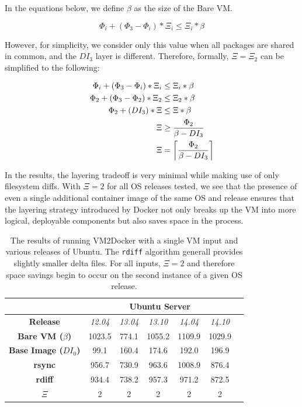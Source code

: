 In the equations below, we define $\beta$ as the size of the Bare VM.

\begin{equation}
\Phi_i + (\Phi_3 - \Phi_i)* \Xi_i \le \Xi_i * \beta
\end{equation}

However, for simplicity, we consider only this value when all packages are shared in common, and the $DI_3$ layer is different. Therefore, formally, $\Xi = \Xi_2$ can be simplified to the following:

\begin{align*}
\Phi_i + (\Phi_3 - \Phi_i)* \Xi_i &\le \Xi_i * \beta \\
\Phi_2 + (\Phi_3 - \Phi_2)* \Xi_2 &\le \Xi_2 * \beta \\
\Phi_2 + (DI_3)* \Xi &\le \Xi * \beta\\
\Xi &\ge \frac{\Phi_2}{\beta - DI_3} \\
\Xi &= \ceil*{\frac{\Phi_2}{\beta - DI_3}}
\end{align*}


In the results, the layering tradeoff is very minimal while making use of only filesystem diffs. With $\Xi =2$ for all OS releases tested, we see that the presence of even a single additional container image of the same OS and release ensures that the layering strategy introduced by Docker not only breaks up the VM into more logical, deployable components but also saves space in the process.

\begin{table}[h]
\centering
    \begin{tabular}{| c | c | c | c | c | c | c |}
    \hline
& \multicolumn{5}{|c|}{\bfseries Ubuntu Server} \\ \hline
    \bfseries Release & \itshape 12.04 & \itshape 13.04 & \itshape 13.10 & \itshape 14.04 & \itshape 14.10 \\ \hline
    \bfseries Bare VM ($\beta$) & 1023.5 & 774.1 & 1055.2 & 1109.9 & 1029.9\\ \hline
    \bfseries Base Image ($DI_0$) & 99.1 & 160.4 & 174.6 & 192.0 & 196.9  \\ \hline
    \bfseries rsync & 956.7 & 730.9 & 963.6 & 1008.9 & 876.4\\ \hline 
    \bfseries rdiff & 934.4 & 738.2 & 957.3 & 971.2 & 872.5\\ \hline 
    \bfseries $\Xi$ & 2 & 2 & 2 & 2 & 2  \\ \hline
    \end{tabular}
\caption{The results of running VM2Docker with a single VM input and various releases of Ubuntu. The \texttt{rdiff} algorithm generall provides slightly smaller delta files. For all inputs, $\Xi = 2$ and therefore space savings begin to occur on the second instance of a given OS release.}
\label{table:diff}
\end{table}

